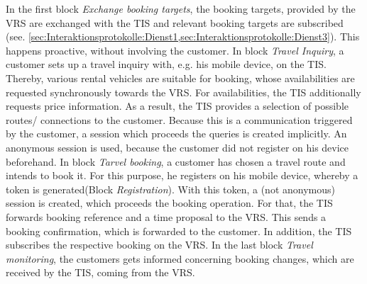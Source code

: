 In the first block \textit{Exchange booking targets}, the booking targets, provided by the VRS are exchanged with the TIS and relevant booking targets are subscribed (see. \cref{sec:Interaktionsprotokolle:Dienst1,sec:Interaktionsprotokolle:Dienst3}). This happens proactive, without involving the customer.
In block \textit{Travel Inquiry}, a customer sets up a travel inquiry with, e.g. his mobile device, on the TIS. Thereby, various rental vehicles are suitable for booking, whose availabilities are requested synchronously towards the VRS. For availabilities, the TIS additionally requests price information. As a result, the TIS provides a selection of possible routes/ connections to the customer. Because this is a communication triggered by the customer, a session which proceeds the queries is created implicitly. An anonymous session is used, because the customer did not register on his device beforehand.
In block \textit{Tarvel booking}, a customer has chosen a travel route and intends to book it. For this purpose, he registers on his mobile device, whereby a token is generated(Block \emph{Registration}). With this token, a (not anonymous) session is created, which proceeds the booking operation. For that, the TIS forwards booking reference and a time proposal to the VRS. This sends a booking confirmation, which is forwarded to the customer. In addition, the TIS subscribes the respective booking on the VRS.
In the last block \textit{Travel monitoring}, the customers gets informed concerning booking changes, which are received by the TIS, coming from the VRS.
